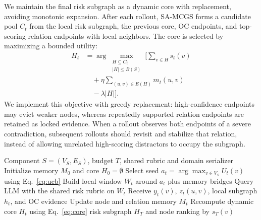 \documentclass[11pt]{article}
\newcommand{\samcgs}{SA-MCGS}
\newcommand{\oc}{OC}
\begin{document}
We maintain the final risk subgraph as a dynamic core with replacement, avoiding monotonic expansion.    After each rollout, \samcgs{} forms a candidate pool $C_t$ from the local risk subgraph, the previous core, \oc{} endpoints, and top-scoring relation endpoints with local neighbors.  The core is selected by maximizing a bounded utility:
\begin{equation}
    \begin{aligned}
    H_t &= \arg\max_{\substack{H\subseteq C_t\\ |H|\leq B(S)}}
    \Bigg[
    \sum_{v\in H}s_t(v)\\
    &\quad + \eta \sum_{(u,v)\in E(H)}m_t(u,v)\\
    &\quad - \lambda |H|
    \Bigg].
    \end{aligned}
    \label{eq:core}
\end{equation}
We implement this objective with greedy replacement: high-confidence endpoints may evict weaker nodes, whereas repeatedly supported relation endpoints are retained as locked evidence.   When a rollout observes both endpoints of a severe contradiction, subsequent rollouts should revisit and stabilize that relation, instead of allowing unrelated high-scoring distractors to occupy the subgraph. 

\begin{algorithm}[t]
\small
\caption{\samcgs{} for one strongly connected component}
\label{alg:samcgs}
\begin{algorithmic}[1]
\REQUIRE Component $S=(V_S,E_S)$, budget $T$, shared rubric and domain serializer
\STATE Initialize memory $M_0$ and core $H_0=\emptyset$
    \STATE Select seed $a_t=\arg\max_{v\in V_S}U_t(v)$ using Eq.~\ref{eq:ucb}
    \STATE Build local window $W_t$ around $a_t$ plus memory bridges
    \STATE Query LLM with the shared risk rubric on $W_t$
    \STATE Receive $y_t(v)$, $z_t(u,v)$, local subgraph $h_t$, and \oc{} evidence
    \STATE Update node and relation memory $M_t$
    \STATE Recompute dynamic core $H_t$ using Eq.~\ref{eq:core}
\ENDFOR
\RETURN risk subgraph $H_T$ and node ranking by $s_T(v)$
\end{algorithmic}
\end{algorithm}
\end{document}

